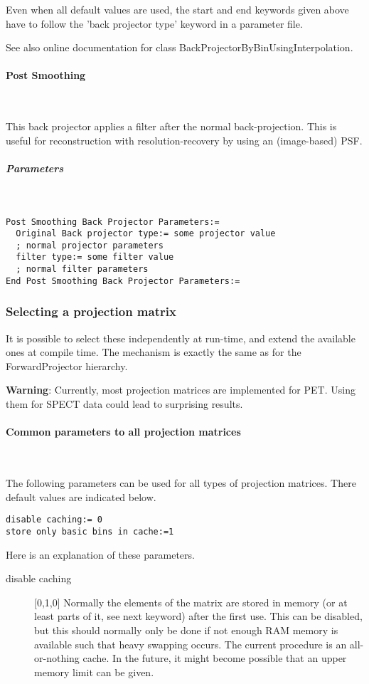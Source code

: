 \documentclass{article}
\newcommand{\subsubsubsection}[1]{\paragraph{#1}\mbox{} \\}
\newcommand{\subsubsubsubsection}[1]{\subparagraph{#1} \mbox{} \\}
\begin{document}
{{{Even when all default values are used, the start and end keywords 
given above have to follow the 'back projector type' keyword 
in a parameter file.


See also online documentation for class BackProjectorByBinUsingInterpolation.

{ \subsubsubsection{Post Smoothing}
}
This back projector applies a filter after the normal back-projection.
This is useful for reconstruction with resolution-recovery 
by using an (image-based) PSF.

{ \subsubsubsubsection{Parameters}
}
\begin{verbatim}
Post Smoothing Back Projector Parameters:=
  Original Back projector type:= some projector value 
  ; normal projector parameters
  filter type:= some filter value
  ; normal filter parameters
End Post Smoothing Back Projector Parameters:=
\end{verbatim}


\subsubsection{
Selecting a projection matrix}
\label{sec:projmatrix}
It is possible to select these independently at run-time, and 
extend the available ones at compile time. The mechanism is exactly 
the same as for the ForwardProjector hierarchy.

\textbf{Warning}: Currently, most projection matrices are implemented for PET. Using them for 
SPECT data could lead to surprising results. 

{ \subsubsubsection{Common parameters to all projection matrices}
}
\label{sec:projmatrixcommon}
The following parameters can be used for all types of projection 
matrices. There default values are indicated below.

\begin{verbatim}
disable caching:= 0
store only basic bins in cache:=1
\end{verbatim}

Here is an explanation of these parameters.

\begin{description}
\item[disable caching] [0,1,0{]}
Normally the elements of the matrix are stored in memory (or 
at least parts of it, see next keyword) after the first use. 
This can be disabled, but this should normally only be done if 
not enough RAM memory is available such that heavy swapping occurs. 
The current procedure is an all-or-nothing cache. In the future, 
it might become possible that an upper memory limit can be given.



\end{description}}}}
\end{document}
